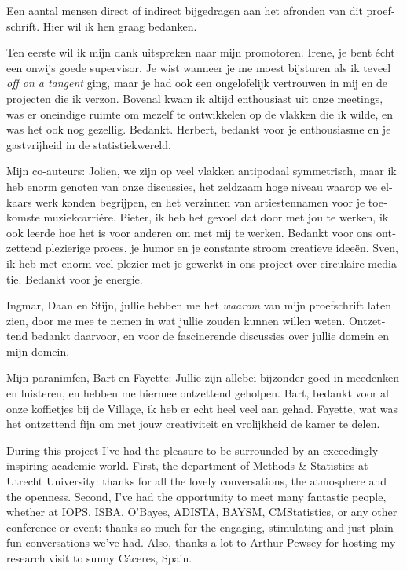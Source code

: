 \documentclass[12pt, a4paper]{book}\usepackage[]{graphicx}\usepackage{xcolor}
\begin{document}
\begin{otherlanguage}{dutch}

Een aantal mensen direct of indirect bijgedragen aan het afronden van dit proefschrift. Hier wil ik hen graag bedanken.

Ten eerste wil ik mijn dank uitspreken naar mijn promotoren. Irene, je bent \'echt een onwijs goede supervisor. Je wist wanneer je me moest bijsturen als ik teveel \textit{off on a tangent} ging, maar je had ook een ongelofelijk vertrouwen in mij en de projecten die ik verzon. Bovenal kwam ik altijd enthousiast uit onze meetings, was er oneindige ruimte om mezelf te ontwikkelen op de vlakken die ik wilde, en was het ook nog gezellig. Bedankt. Herbert, bedankt voor je enthousiasme en je gastvrijheid in de statistiekwereld.

Mijn co-auteurs: Jolien, we zijn op veel vlakken antipodaal symmetrisch, maar ik heb enorm genoten van onze discussies, het zeldzaam hoge niveau waarop we elkaars werk konden begrijpen, en het verzinnen van artiestennamen voor je toekomste muziekcarri\'ere. Pieter, ik heb het gevoel dat door met jou te werken, ik ook leerde hoe het is voor anderen om met mij te werken. Bedankt voor ons ontzettend plezierige proces, je humor en je constante stroom creatieve idee\"en. Sven, ik heb met enorm veel plezier met je gewerkt in ons project over circulaire mediatie. Bedankt voor je energie.

Ingmar, Daan en Stijn, jullie hebben me het \textit{waarom} van mijn proefschrift laten zien, door me mee te nemen in wat jullie zouden kunnen willen weten. Ontzettend bedankt daarvoor, en voor de fascinerende discussies over jullie domein en mijn domein.

Mijn paranimfen, Bart en Fayette: Jullie zijn allebei bijzonder goed in meedenken en luisteren, en hebben me hiermee ontzettend geholpen. Bart, bedankt voor al onze koffietjes bij de Village, ik heb er echt heel veel aan gehad. Fayette, wat was het ontzettend fijn om met jouw creativiteit en vrolijkheid de kamer te delen.

\end{otherlanguage}

\vspace{.5cm}
During this project I've had the pleasure to be surrounded by an exceedingly inspiring academic world. First, the department of Methods \& Statistics at Utrecht University: thanks for all the lovely conversations, the atmosphere and the openness. Second, I've had the opportunity to meet many fantastic people, whether at IOPS, ISBA, O'Bayes, ADISTA, BAYSM, CMStatistics, or any other conference or event: thanks so much for the engaging, stimulating and just plain fun conversations we've had. Also, thanks a lot to Arthur Pewsey for hosting my research visit to sunny C\'aceres, Spain.
\end{document}
